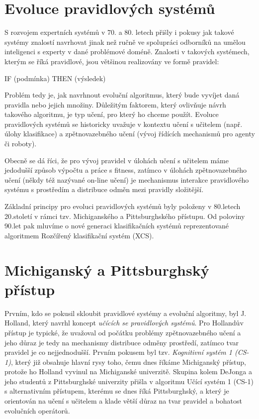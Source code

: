 \section{Evoluce pravidlových systémů}

S rozvojem expertních systémů v 70. a 80. letech přišly i pokusy jak takové systémy znalostí navrhovat jinak než ručně ve spolupráci odborníků na umělou inteligenci s experty v dané problémové doméně. Znalosti v takových systémech, kterým se říká pravidlové, jsou většinou realizovány ve formě pravidel: 

IF (podmínka) THEN (výsledek)

Problém tedy je, jak navrhnout evoluční algoritmus, který bude vyvíjet daná pravidla nebo jejich množiny. Důležitým faktorem, který ovlivňuje návrh takového algoritmu, je typ učení, pro který ho chceme použít. Evoluce pravidlových systémů se historicky uvažuje v kontextu učení s učitelem (např. úlohy klasifikace) a zpětnovazebného učení (vývoj řídících mechanismů pro agenty či roboty). 

Obecně se dá říci, že pro vývoj pravidel v úlohách učení s učitelem máme jedodušší způsob výpočtu a práce s fitness, zatímco v úlohách zpětnovazebného učení (někdy též nazývané on-line učení) je mechanismus interakce pravidlového systému s prostředím a distribuce odměn mezi pravidly složitější.  

Základní principy pro evoluci pravidlových systémů byly položeny v 80.letech 20.století v rámci tzv. Michiganského a Pittsburghského přístupu. Od poloviny 90.let pak mluvíme o nové generaci klasifikačních systémů reprezentované algoritmem Rozčířený klasifikační systém (XCS). 


\section{Michiganský a Pittsburghský přístup}

Prvním, kdo se pokusil skloubit pravidlové systémy a evoluční algoritmy, byl J. Holland, který navrhl koncept \emph{učících se pravidlových systémů}. Pro Hollandův přístup je typické, že uvažoval od počátku problémy zpětnovazebného učení a jeho důraz je tedy na mechanismy distribuce odměny prostředí, zatímco tvar pravidel je co nejjednodušší. Prvním pokusem byl tzv. \emph{Kognitivní systém 1 (CS-1)}, který již obsahuje hlavní rysy toho, čemu dnes říkáme Michiganský přístup, protože ho Holland vyvinul na Michiganské univerzitě. Skupina kolem DeJonga a jeho studentů z Pittsburghské univerzity přišla v algoritmu Učící systém 1 (CS-1) s alternativním přístupem, kterému se dnes říká Pittsburghský, a který je orientován na učení s učitelem a klade větší důraz na tvar pravidel a bohatost evolučních operátorů. 

